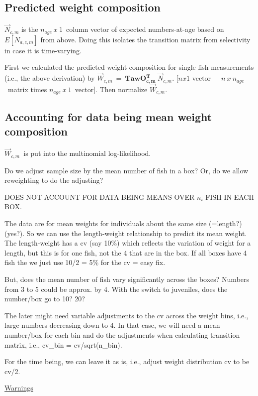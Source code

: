 \documentclass[a4paper,11pt,twoside,pdftex,draft]{article}
\begin{document}
\subsection{Predicted weight composition}



$\overrightarrow N_{c,m}$ is the $n_{age}\ x\ 1$\ column vector of expected numbers-at-age based on $E[N_{a,c,m}]$ from above. Doing this isolates the transition matrix from selectivity in case it is time-varying.

First we calculated the predicted weight composition for single fish measurements (i.e., the above derivation) by $\overrightarrow W_{c,m}\ =\ \mathbf{TawO_{c,m}^T}\ \overrightarrow N_{c,m}$.
[$nx1$ vector\ \ \ $n\ x\ n_{age}$\ matrix times $n_{age}\ x\ 1$\ vector]. Then normalize $\overrightarrow W_{c,m}$.

\subsection{Accounting for data being mean weight composition}
$\overrightarrow W_{c,m}$\ is put into the multinomial log-likelihood.

Do we adjust sample size by the mean number of fish in a box? Or, do we allow reweighting to do the adjusting?

DOES NOT ACCOUNT FOR DATA BEING MEANS OVER $n_i$ FISH IN EACH BOX.

The data are for mean weights for individuals about the same size (=length?) (yes?).
So we can use the length-weight relationship to predict its mean weight.
The length-weight has a cv (say 10\%) which reflects the variation of weight for a length, but this is for one fish, not the 4 that are in the box. If all boxes have 4 fish the we just use 10/2 = 5\% for the cv = easy fix.

But, does the mean number of fish vary significantly across the boxes?
Numbers from 3 to 5 could be approx. by 4.
With the switch to juveniles, does the number/box go to 10? 20?

The later might need variable adjustments to the cv across the weight bins, i.e., large numbers decreasing down to 4.
In that case, we will need a mean number/box for each bin and do the adjustments when calculating transition matrix, i.e., cv\_bin = cv/sqrt(n\_bin).

For the time being, we can leave it as is, i.e., adjust weight distribution cv to be cv/2.

\bigskip
\underline{Warnings}
\end{document}
